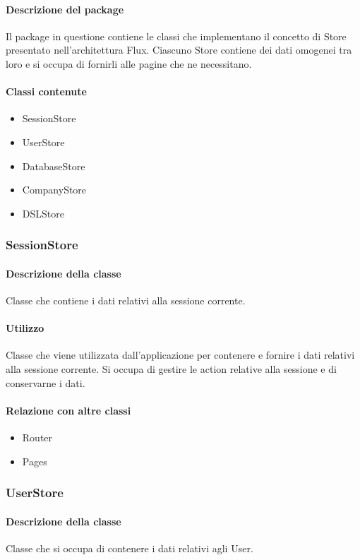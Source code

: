 \paragraph*{Descrizione del package}
Il package in questione contiene le classi che implementano il concetto di Store presentato nell'architettura Flux. Ciascuno Store contiene dei dati omogenei tra loro e si occupa di fornirli alle pagine che ne necessitano.
\paragraph*{Classi contenute}
\begin{itemize}
\item SessionStore
\item UserStore
\item DatabaseStore
\item CompanyStore
\item DSLStore
\end{itemize}

\subsubsection{SessionStore}
\paragraph*{Descrizione della classe}
Classe che contiene i dati relativi alla sessione corrente.
\paragraph*{Utilizzo}
Classe che viene utilizzata dall'applicazione per contenere e fornire i dati relativi alla sessione corrente. Si occupa di gestire le action relative alla sessione e di conservarne i dati.
\paragraph*{Relazione con altre classi}
\begin{itemize}
\item Router
\item Pages
\end{itemize}

\subsubsection{UserStore}
\paragraph*{Descrizione della classe}
Classe che si occupa di contenere i dati relativi agli User.
